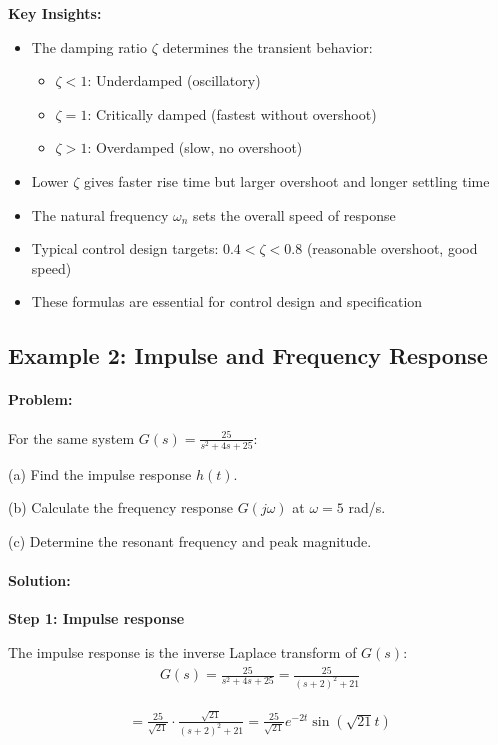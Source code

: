 \documentclass[11pt,a4paper]{article}
\begin{document}
\textbf{Key Insights:}
\begin{itemize}
\item The damping ratio $\zeta$ determines the transient behavior:
  \begin{itemize}
  \item $\zeta < 1$: Underdamped (oscillatory)
  \item $\zeta = 1$: Critically damped (fastest without overshoot)
  \item $\zeta > 1$: Overdamped (slow, no overshoot)
  \end{itemize}
\item Lower $\zeta$ gives faster rise time but larger overshoot and longer settling time
\item The natural frequency $\omega_n$ sets the overall speed of response
\item Typical control design targets: $0.4 < \zeta < 0.8$ (reasonable overshoot, good speed)
\item These formulas are essential for control design and specification
\end{itemize}

\subsection{Example 2: Impulse and Frequency Response}

\paragraph{Problem:} For the same system $G(s) = \frac{25}{s^2 + 4s + 25}$:

(a) Find the impulse response $h(t)$.

(b) Calculate the frequency response $G(j\omega)$ at $\omega = 5$ rad/s.

(c) Determine the resonant frequency and peak magnitude.

\paragraph{Solution:}

\textbf{Step 1: Impulse response}

The impulse response is the inverse Laplace transform of $G(s)$:
\begin{align}
G(s) = \frac{25}{s^2 + 4s + 25} = \frac{25}{(s+2)^2 + 21}
\end{align}

\begin{align}
= \frac{25}{\sqrt{21}} \cdot \frac{\sqrt{21}}{(s+2)^2 + 21} = \frac{25}{\sqrt{21}}e^{-2t}\sin(\sqrt{21}t)
\end{align}
\end{document}
